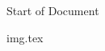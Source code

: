 \documentclass{../latex-setting/cmemoir}
\begin{document}
\tableofcontents

Start of Document

{img.tex}
\end{document}
